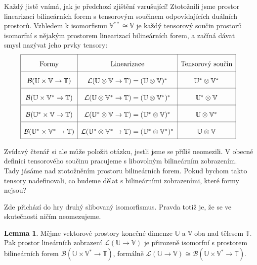 \documentclass[a5paper,12pt]{amsbook}
\theoremstyle{definition}
\newtheorem{lemma}[theorem]{Lemma}
\newcommand{\myspace}[1]{\mathbb{#1}}
\begin{document}
\noindent
Každý jistě vnímá, jak je předchozí zjištění vzrušující! Ztotožnili jsme prostor linearizací
bilineárních forem s tensorovým součinem odpovídajících duálních prostorů. Vzhledem k isomorfismu
$\myspace{V^{**}}\cong\myspace{V}$ je každý tensorový součin prostorů isomorfní s nějakým prostorem
linearizací bilineárních forem, a začíná dávat smysl nazývat jeho prvky tensory:
\begin{equation*}
\def\arraystretch{2.0}
\begin{array}{|c|c|c|}
\hline
\text{Formy} & \text{Linearizace} & \text{Tensorový součin} \\
\hline
\mathcal{B}(\myspace{U}\times\myspace{V}\rightarrow\myspace{T}) &
\mathcal{L}(\myspace{U}\otimes\myspace{V}\rightarrow\myspace{T}) = (\myspace{U}\otimes\myspace{V})^* &
\myspace{U^*}\otimes\myspace{V^*} \\
\hline
\mathcal{B}(\myspace{U}\times\myspace{V^*}\rightarrow\myspace{T}) &
\mathcal{L}(\myspace{U}\otimes\myspace{V^*}\rightarrow\myspace{T}) = (\myspace{U}\otimes\myspace{V^*})^* &
\myspace{U^*}\otimes\myspace{V} \\
\hline
\mathcal{B}(\myspace{U^*}\times\myspace{V}\rightarrow\myspace{T}) &
\mathcal{L}(\myspace{U^*}\otimes\myspace{V}\rightarrow\myspace{T}) = (\myspace{U^*}\otimes\myspace{V})^* &
\myspace{U}\otimes\myspace{V^*} \\
\hline
\mathcal{B}(\myspace{U^*}\times\myspace{V^*}\rightarrow\myspace{T}) &
\mathcal{L}(\myspace{U^*}\otimes\myspace{V^*}\rightarrow\myspace{T}) = (\myspace{U^*}\otimes\myspace{V^*})^* &
\myspace{U}\otimes\myspace{V} \\
\hline
\end{array}
\end{equation*}

\noindent
Zvídavý čtenář si ale může položit otázku, jestli jsme se příliš neomezili. V obecné definici tensorového
součinu pracujeme s libovolným bilineárním zobrazením. Tady jásáme nad ztotožněním prostoru bilineárních
forem. Pokud bychom takto tensory nadefinovali, co budeme dělat s bilineárními zobrazeními, které formy
nejsou?

Zde přichází do hry druhý slibovaný isomorfismus. Pravda totiž je, že se ve skutečnosti ničím neomezujeme.

\begin{lemma}
Mějme vektorové prostory konečné dimenze $\myspace{U}$ a $\myspace{V}$ oba nad tělesem $\myspace{T}$.
Pak prostor lineárních zobrazení $\mathcal{L}(\myspace{U}\rightarrow\myspace{V})$ je 
přirozeně isomorfní s prostorem bilineárních forem
$\mathcal{B}(\myspace{U}\times\myspace{V^*}\rightarrow\myspace{T})$, formálně
$\mathcal{L}(\myspace{U}\rightarrow\myspace{V})\cong
\mathcal{B}(\myspace{U}\times\myspace{V^*}\rightarrow\myspace{T})$.
\end{lemma}
\end{document}

